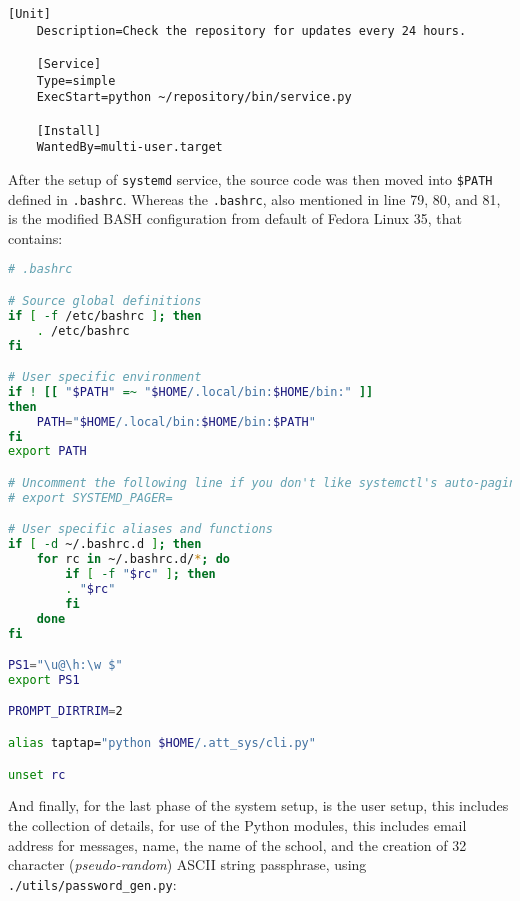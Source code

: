 \documentclass[12pt]{article}
\begin{document}
\singlespacing
\begin{lstlisting}[caption={\texttt{systemd} service written to intercept pull an update to repository every 24 hours.}]
	[Unit]
	Description=Check the repository for updates every 24 hours.
	
	[Service]
	Type=simple
	ExecStart=python ~/repository/bin/service.py
	
	[Install]
	WantedBy=multi-user.target
\end{lstlisting}
\doublespacing

After the setup of \texttt{systemd} service, the source code was then moved into \texttt{\$PATH} defined in \texttt{.bashrc}. Whereas the \texttt{.bashrc}, also mentioned in line 79, 80, and 81, is the modified BASH configuration from default of Fedora Linux 35, that contains:

\singlespacing
\begin{lstlisting}[language=bash, caption={\texttt{.bashrc}}]
# .bashrc

# Source global definitions
if [ -f /etc/bashrc ]; then
	. /etc/bashrc
fi

# User specific environment
if ! [[ "$PATH" =~ "$HOME/.local/bin:$HOME/bin:" ]]
then
	PATH="$HOME/.local/bin:$HOME/bin:$PATH"
fi
export PATH

# Uncomment the following line if you don't like systemctl's auto-paging feature:
# export SYSTEMD_PAGER=

# User specific aliases and functions
if [ -d ~/.bashrc.d ]; then
	for rc in ~/.bashrc.d/*; do
		if [ -f "$rc" ]; then
		. "$rc"
		fi
	done
fi

PS1="\u@\h:\w $"
export PS1

PROMPT_DIRTRIM=2

alias taptap="python $HOME/.att_sys/cli.py"

unset rc
\end{lstlisting}
\doublespacing

And finally, for the last phase of the system setup, is the user setup, this includes the collection of details, for use of the Python modules, this includes email address for messages, name, the name of the school, and the creation of 32 character (\textit{pseudo-random}) ASCII string passphrase, using \texttt{./utils/password\_gen.py}:
\end{document}
